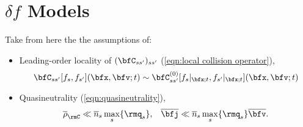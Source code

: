 \section{$\delta\! f$ Models}

    Take from here the the assumptions of:
    \begin{itemize}
        \item  Leading-order locality of $(\bfC_{ss'})_{ss'}$ (\ref{eqn:local collision operator}),
        \begin{equation}
            \bfC_{ss'}[f_{s}, f_{s'}](\bfx, \bfv; t)  \sim  \bfC_{ss'}^{(0)}[f_{s}|_{\bfx; t}, f_{s'}|_{\bfx; t}](\bfx, \bfv; t)
        \end{equation}
        \item  Quasineutrality (\ref{eqn:quasineutrality}),
        \begin{align}
            \overline{\rho}_{\rmC}  \ll \overline{n}_{s}\max_{s}\{\rmq_{s}\},  &&
            \overline{\bfj}         \ll  \overline{n}_{s}\max_{s}\{\rmq_{s}\}\overline{\bfv}.
        \end{align}
    \end{itemize}

    \line

